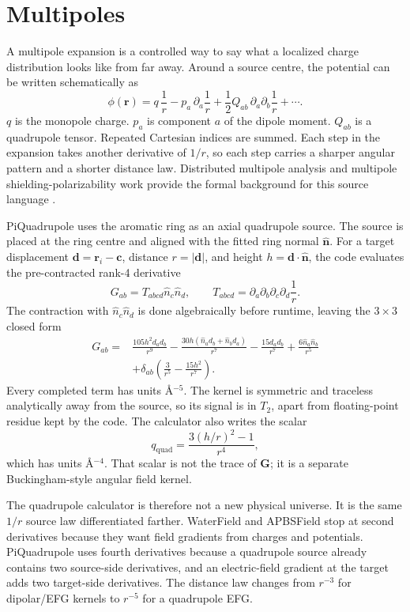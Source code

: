 \documentclass[11pt]{article}
\begin{document}
\section{Multipoles}

A multipole expansion is a controlled way to say what a localized charge
distribution looks like from far away. Around a source centre, the potential can
be written schematically as
\[
  \phi(\bm r)
  =
  q\,\frac{1}{r}
  -p_a\,\partial_a\frac{1}{r}
  +\frac12 Q_{ab}\,\partial_a\partial_b\frac{1}{r}
  +\cdots .
\]
\(q\) is the monopole charge. \(p_a\) is component \(a\) of the dipole moment.
\(Q_{ab}\) is a quadrupole tensor. Repeated Cartesian indices are summed. Each
step in the expansion takes another derivative of \(1/r\), so each step carries
a sharper angular pattern and a shorter distance law. Distributed multipole
analysis and multipole shielding-polarizability work provide the formal
background for this source language \cite{stone2005,kjaer2011}.

PiQuadrupole uses the aromatic ring as an axial quadrupole source. The source
is placed at the ring centre and aligned with the fitted ring normal
\(\hat{\bm n}\). For a target displacement \(\bm d=\bm r_i-\bm c\), distance
\(r=|\bm d|\), and height \(h=\bm d\cdot\hat{\bm n}\), the code evaluates the
pre-contracted rank-4 derivative
\[
  G_{ab}=T_{abcd}\hat n_c\hat n_d,
  \qquad
  T_{abcd}
  =
  \partial_a\partial_b\partial_c\partial_d\frac{1}{r}.
\]
The contraction with \(\hat n_c\hat n_d\) is done algebraically before runtime,
leaving the \(3\times3\) closed form
\[
\begin{aligned}
  G_{ab}={}&
  \frac{105h^2 d_a d_b}{r^9}
  -\frac{30h(\hat n_a d_b+\hat n_b d_a)}{r^7}
  -\frac{15d_a d_b}{r^7}
  +\frac{6\hat n_a\hat n_b}{r^5} \\
  &+\delta_{ab}\left(\frac{3}{r^5}-\frac{15h^2}{r^7}\right).
\end{aligned}
\]
Every completed term has units \(\si{\angstrom^{-5}}\). The kernel is symmetric
and traceless analytically away from the source, so its signal is in \(T_2\),
apart from floating-point residue kept by the code. The calculator also writes
the scalar
\[
  q_{\mathrm{quad}}=\frac{3(h/r)^2-1}{r^4},
\]
which has units \(\si{\angstrom^{-4}}\). That scalar is not the trace of
\(\bm G\); it is a separate Buckingham-style angular field kernel.

The quadrupole calculator is therefore not a new physical universe. It is the
same \(1/r\) source law differentiated farther. WaterField and APBSField stop at
second derivatives because they want field gradients from charges and
potentials. PiQuadrupole uses fourth derivatives because a quadrupole source
already contains two source-side derivatives, and an electric-field gradient at
the target adds two target-side derivatives. The distance law changes from
\(r^{-3}\) for dipolar/EFG kernels to \(r^{-5}\) for a quadrupole EFG.
\end{document}
